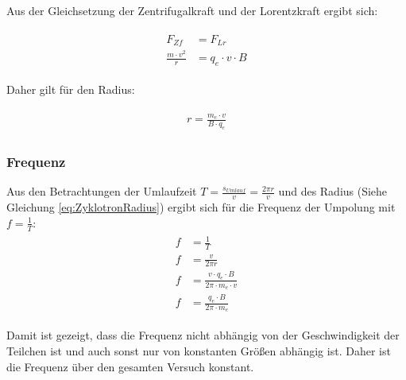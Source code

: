 Aus der Gleichsetzung der Zentrifugalkraft und der Lorentzkraft ergibt sich: 

\begin{align}
\begin{split}
	F_{Zf} &= F_{Lr} \\
	\frac{m \cdot v^2}{r} &= q_e \cdot v \cdot B
\end{split}
\end{align}

\noindent Daher gilt für den Radius:

\begin{align} \label{eq:ZyklotronRadius}
\begin{split}
	r = \frac{m_e \cdot v}{B \cdot q_e}
\end{split}
\end{align}


\subsubsection{Frequenz}

Aus den Betrachtungen der Umlaufzeit $T = \frac{s_{Umlauf}}{v} = \frac{2 \pi r}{v}$ und des Radius (Siehe Gleichung \ref{eq:ZyklotronRadius}) ergibt sich für die Frequenz der Umpolung mit $f=\frac{1}{T}$: \\

\begin{align}
\begin{split}
	f &= \frac{1}{T} \\
	f &= \frac{v}{2 \pi r} \\
	f &= \frac{v \cdot q_e \cdot B}{2 \pi \cdot m_e \cdot v} \\
	f &= \frac{q_e \cdot B}{2 \pi \cdot m_e}
\end{split}
\end{align}

\noindent Damit ist gezeigt, dass die Frequenz nicht abhängig von der Geschwindigkeit der Teilchen ist und auch sonst nur von konstanten Größen abhängig ist. Daher ist die Frequenz über den gesamten Versuch konstant.




